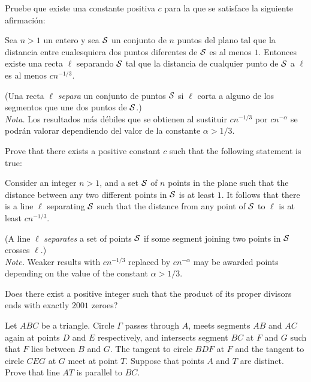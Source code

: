 \begin{probHB}
	Pruebe que existe una constante positiva $c$ para la que se satisface la siguiente afirmación:

	Sea $n>1$ un entero y sea $\cal S$ un conjunto de $n$ puntos del plano tal que la distancia entre cualesquiera dos puntos diferentes de $\cal S$ es al menos $1$. Entonces existe una recta $\ell$ separando $\cal S$ tal que la distancia de cualquier punto de $\cal S$ a $\ell$ es al menos $cn^{-1/3}$.

	(Una recta $\ell$ \emph{separa} un conjunto de puntos $\cal S$ si $\ell$ corta a alguno de los segmentos que une dos puntos de $\cal S$.)\\[4pt]
	\emph{Nota.} Los resultados más débiles que se obtienen al sustituir $cn^{-1/3}$ por $cn^{-\alpha}$ se podrán valorar dependiendo del valor de la constante $\alpha>1/3$.
	\begin{hint}
		Prove that there exists a positive constant $c$ such that the following statement is true:

		Consider an integer $n>1$, and a set $\cal S$ of $n$ points in the plane such that the distance between any two different points in $\cal S$ is at least $1$. It follows that there is a line $\ell$ separating $\cal S$ such that the distance from any point of $\cal S$ to $\ell$ is at least $cn^{-1/3}$.

		(A line $\ell$ \emph{separates} a set of points $\cal S$ if some segment joining two points in $\cal S$ crosses $\ell$.)\\[4pt]
		\emph{Note.} Weaker results with $cn^{-1/3}$ replaced by $cn^{-\alpha}$ may be awarded points depending on the value of the constant $\alpha>1/3$.
	\end{hint}
\end{probHB}


\begin{probEG}[Russia 2001]
	Does there exist a positive integer such that the product of its proper divisors ends with exactly $2001$ zeroes?
\end{probEG}


\begin{probEG}[ISL 2019/G1]
	Let $ABC$ be a triangle. Circle $\Gamma$ passes through $A$, meets segments $AB$ and $AC$ again at points $D$ and $E$ respectively, and intersects segment $BC$ at $F$ and $G$ such that $F$ lies between $B$ and $G$. The tangent to circle $BDF$ at $F$ and the tangent to circle $CEG$ at $G$ meet at point $T$. Suppose that points $A$ and $T$ are distinct. Prove that line $AT$ is parallel to $BC$.
\end{probEG}


